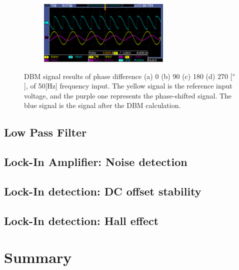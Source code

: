\documentclass{article}
\begin{document}
\begin{figure}[ht]
\begin{subfigure}[b]{6.3cm}
  \centering
  \includegraphics[width=6.3cm]{../raw_data/TEK00358.PNG}
  \caption{}
\end{subfigure}
\hfill
  \caption{DBM signal results of phase difference (a) 0 (b) 90 (c) 180 (d) 270 [$\degree$], of 50[Hz] frequency input.
      The yellow signal is the reference input voltage, and the purple one represents the phase-shifted signal.
      The blue signal is the signal after the DBM calculation.
   }
  \label{fig: DBM_plot}
\end{figure}
\subsection{Low Pass Filter}
\label{results: low pass filter}

\subsection{Lock-In Amplifier: Noise detection}
\label{results: noise detection}


\subsection{Lock-In detection: DC offset stability}



\subsection{Lock-In detection: Hall effect}



\section{Summary}

\cite{abcd}


\end{document}
